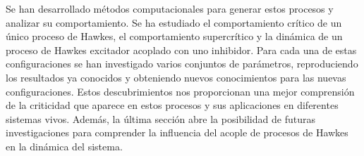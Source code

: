Se han desarrollado métodos computacionales para generar estos procesos y analizar su comportamiento. Se ha estudiado el comportamiento crítico de un único proceso de Hawkes, el comportamiento
supercrítico y la dinámica de un proceso de Hawkes excitador acoplado con uno inhibidor. Para cada una de estas configuraciones se han investigado varios conjuntos de parámetros, reproduciendo 
los resultados ya conocidos y obteniendo nuevos conocimientos para las nuevas configuraciones. Estos descubrimientos nos proporcionan una mejor comprensión de la criticidad que aparece en 
estos procesos y sus aplicaciones en diferentes sistemas vivos. Además, la última sección abre la posibilidad de futuras investigaciones para comprender la influencia del acople
de procesos de Hawkes en la dinámica del sistema.